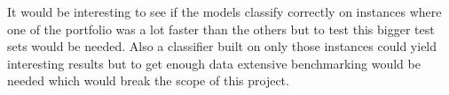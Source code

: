 It would be interesting to see if the models classify correctly on instances where one of the portfolio was a lot faster than the others but to test this bigger test sets would be needed. Also a classifier built on only those instances could yield interesting results but to get enough data extensive benchmarking would be needed which would break the scope of this project.

